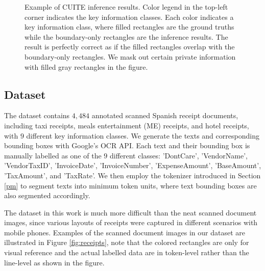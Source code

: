 \documentclass[10pt,twocolumn,letterpaper]{article}
\begin{document}
\begin{figure}
\begin{center}
\end{center}
   \caption{Example of CUITE inference results. Color legend in the top-left corner indicates the key information classes. Each color indicates a key information class, where filled rectangles are the ground truths while the boundary-only rectangles are the inference results. The result is perfectly correct as if the filled rectangles overlap with the boundary-only rectangles. We mask out certain private information with filled gray rectangles in the figure.}
\label{fig:result}
\end{figure}

\subsection{Dataset}
The dataset contains $4,484$ annotated scanned Spanish receipt documents, including taxi receipts, meals entertainment (ME) receipts, and hotel receipts, with $9$ different key information classes. We generate the texts and corresponding bounding boxes with Google's OCR API. Each text and their bounding box is manually labelled as one of the $9$ different classes: 'DontCare', 'VendorName', 'VendorTaxID', 'InvoiceDate', 'InvoiceNumber', 'ExpenseAmount', 'BaseAmount', 'TaxAmount', and 'TaxRate'. We then employ the tokenizer introduced in Section \ref{pm} to segment texts into minimum token units, where text bounding boxes are also segmented accordingly. 

The dataset in this work is much more difficult than the neat scanned document images, since various layouts of receipts were captured in different scenarios with mobile phones. Examples of the scanned document images in our dataset are illustrated in Figure \ref{fig:receipts}, note that the colored rectangles are only for visual reference and the actual labelled data are in token-level rather than the line-level as shown in the figure.
\end{document}
